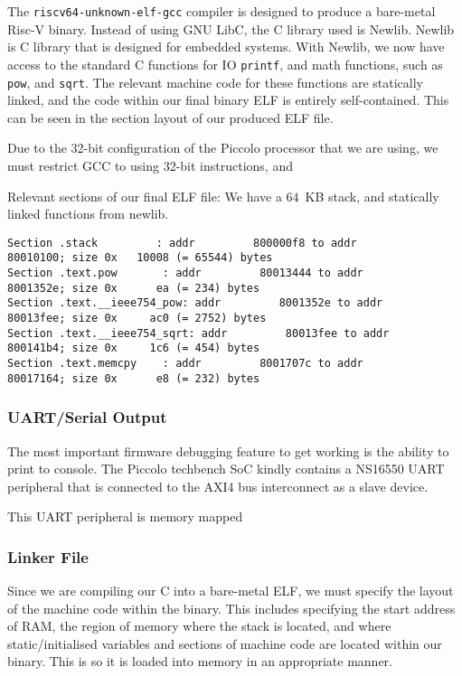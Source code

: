 \documentclass[a4paper,8pt]{report}
\begin{document}
The \texttt{riscv64-unknown-elf-gcc} compiler is designed to produce a
bare-metal Risc-V binary. Instead of using GNU LibC, the C library used is
Newlib. Newlib is C library that is designed for embedded systems. With Newlib,
we now have access to the standard C functions for IO \texttt{printf}, and math
functions, such as \texttt{pow}, and \texttt{sqrt}. The relevant machine code
for these functions are statically linked, and the code within our final binary
ELF is entirely self-contained. This can be seen in the section layout of our
produced ELF file.

Due to the 32-bit configuration of the Piccolo processor that we are using, we
must restrict GCC to using 32-bit instructions, and 

Relevant sections of our final ELF file: We have a $64$~KB stack, and statically
linked functions from newlib.  
\tiny
\begin{verbatim}
Section .stack         : addr         800000f8 to addr         80010100; size 0x   10008 (= 65544) bytes
Section .text.pow       : addr         80013444 to addr         8001352e; size 0x      ea (= 234) bytes
Section .text.__ieee754_pow: addr         8001352e to addr         80013fee; size 0x     ac0 (= 2752) bytes
Section .text.__ieee754_sqrt: addr         80013fee to addr         800141b4; size 0x     1c6 (= 454) bytes
Section .text.memcpy    : addr         8001707c to addr         80017164; size 0x      e8 (= 232) bytes
\end{verbatim}
\normalsize

\subsubsection{UART/Serial Output}
The most important firmware debugging feature to get working is the ability to
print to console. The Piccolo techbench SoC kindly contains a NS16550 UART
peripheral that is connected to the AXI4 bus interconnect as a slave device.  

This UART peripheral is memory mapped 


\subsubsection{Linker File}
Since we are compiling our C into a bare-metal ELF, we must specify the layout
of the machine code within the binary. This includes specifying the start
address of RAM, the region of memory where the stack is located, and where
static/initialised variables and sections of machine code are located within our
binary. This is so it is loaded into memory in an appropriate manner.
\end{document}
